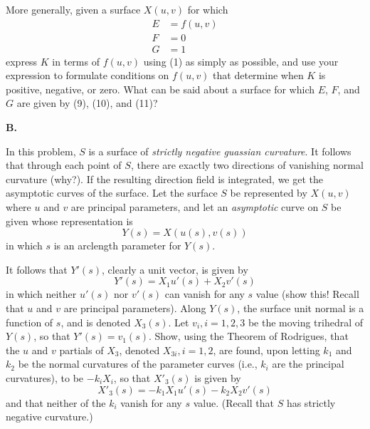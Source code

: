 \documentclass{book}
\begin{document}
More generally, given a surface $X(u,v)$ for which
\begin{align}
E & = f(u,v) \\
F & = 0 \\
G & = 1
\end{align}
express $K$ in terms of $f(u,v)$ using (1) as simply as possible, and use your expression to formulate conditions on $f(u,v)$ that determine when $K$ is positive, negative, or zero. What can be said about a surface for which $E$, $F$, and $G$ are given by (9), (10), and (11)?

\vspace{0.3cm}

\noindent \textbf{B.} 

\vspace{0.3cm}

In this problem, $S$ is a surface of \emph{strictly negative guassian curvature}. It follows that through each point of $S$, there are exactly two directions of vanishing normal curvature (why?). If the resulting direction field is integrated, we get the asymptotic curves of the surface. Let the surface $S$ be represented by $X(u,v)$ where $u$ and $v$ are principal parameters, and let an \emph{asymptotic} curve on $S$ be given whose representation is
\begin{equation}
Y(s) = X( u(s), v(s) )
\end{equation}
in which $s$ is an arclength parameter for $Y(s)$.

It follows that $Y'(s)$, clearly a unit vector, is given by
\begin{equation}
Y'(s) = X_{1} u'(s) + X_{2} v'(s)
\end{equation}
in which neither $u'(s)$ nor $v'(s)$ can vanish for any $s$ value (show this! Recall that $u$ and $v$ are principal parameters). Along $Y(s)$, the surface unit normal is a function of $s$, and is denoted $X_{3}(s)$. Let $v_{i}, i = 1,2,3$ be the moving trihedral of $Y(s)$, so that $Y'(s) = v_{1}(s)$. Show, using the Theorem of Rodrigues, that the $u$ and $v$ partials of $X_{3}$, denoted $X_{3i}, i = 1,2$, are found, upon letting $k_{1}$ and $k_{2}$ be the normal curvatures of the parameter curves (i.e., $k_{i}$ are the principal curvatures), to be $-k_{i} X_{i}$, so that $X'_{3}(s)$ is given by
\begin{equation}
X'_{3}(s) = - k_{1} X_{1} u'(s) - k_{2} X_{2} v'(s)
\end{equation}
and that neither of the $k_{i}$ vanish for any $s$ value. (Recall that $S$ has strictly negative curvature.)
\end{document}
